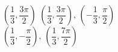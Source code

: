 { $\left( \dfrac{1}{3}, \dfrac{3\pi}{2} \right)$}
{$\left( \dfrac{1}{3}, \dfrac{3\pi}{2} \right), \, \left( -\dfrac{1}{3}, \dfrac{\pi}{2} \right)$\\$\left( \dfrac{1}{3}, -\dfrac{\pi}{2} \right), \, \left( \dfrac{1}{3}, \dfrac{7\pi}{2} \right)$\\ }
